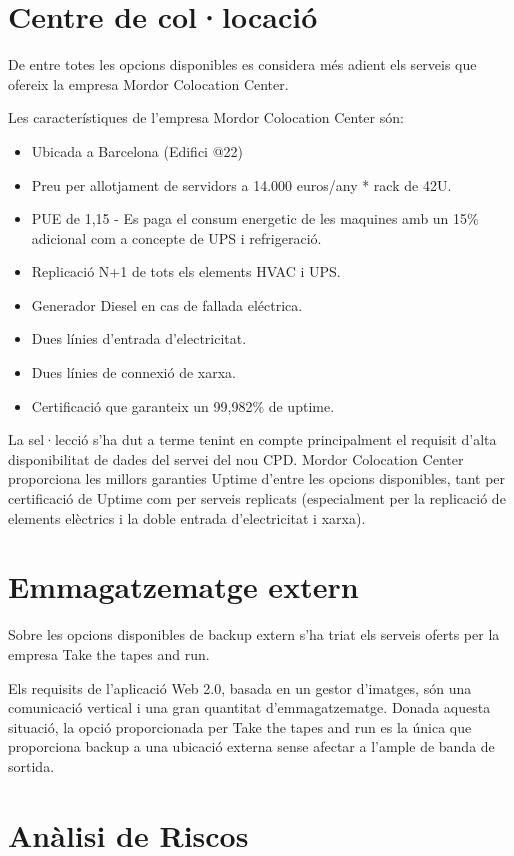 \documentclass[a4paper, 11pt]{article}
\begin{document}
\section{Centre de col·locació}

De entre totes les opcions disponibles es considera més adient els serveis que ofereix la empresa Mordor Colocation Center. 

Les característiques de l’empresa Mordor Colocation Center són:

\begin{itemize}
\item Ubicada a Barcelona (Edifici @22)
\item Preu per allotjament de servidors a 14.000 euros/any * rack de 42U.
\item PUE de 1,15 - Es paga el consum energetic de les maquines amb un 15\% adicional com a concepte de UPS i refrigeració.
\item Replicació N+1 de tots els elements HVAC i UPS.
\item Generador Diesel en cas de fallada eléctrica.
\item Dues línies d’entrada d’electricitat.
\item Dues línies de connexió de xarxa.
\item Certificació que garanteix un 99,982\% de uptime.
\end{itemize}

La sel·lecció s’ha dut a terme tenint en compte principalment el requisit d’alta disponibilitat de dades del servei del nou CPD. Mordor Colocation Center proporciona les millors garanties Uptime d’entre les opcions disponibles, tant per certificació de Uptime com per serveis replicats (especialment per la replicació de elements elèctrics i la doble entrada d’electricitat i xarxa).

\section{Emmagatzematge extern}
Sobre les opcions disponibles de backup extern s’ha triat els serveis oferts per la empresa Take the tapes and run.

Els requisits de l’aplicació Web 2.0, basada en un gestor d’imatges, són una comunicació vertical i una gran quantitat d’emmagatzematge. Donada aquesta situació, la opció proporcionada per Take the tapes and run es la única que proporciona backup a una ubicació externa sense afectar a l'ample de banda de sortida.

\section{Anàlisi de Riscos}
\end{document}
